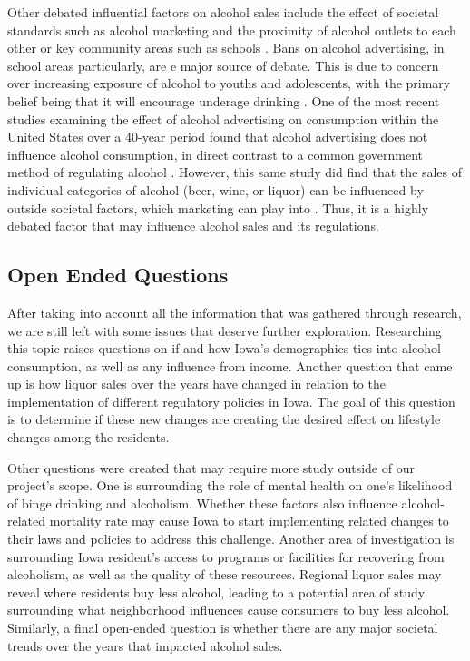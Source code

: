 \documentclass{article}
\begin{document}
Other debated influential factors on alcohol sales include the effect of societal standards such as alcohol marketing and the proximity of alcohol outlets to each other or key community areas such as schools \cite{campbell2009effectiveness, islam2022usefulness, wilcox2015beer}. Bans on alcohol advertising, in school areas particularly, are e major source of debate. This is due to concern over increasing exposure of alcohol to youths and adolescents, with the primary belief being that it will encourage underage drinking \cite{wilcox2015beer}. One of the most recent studies examining the effect of alcohol advertising on consumption within the United States over a 40-year period found that alcohol advertising does not influence alcohol consumption, in direct contrast to a common government method of regulating alcohol \cite{wilcox2015beer, babor2010alcohol}. However, this same study did find that the sales of individual categories of alcohol (beer, wine, or liquor) can be influenced by outside societal factors, which marketing can play into \cite{wilcox2015beer}. Thus, it is a highly debated factor that may influence alcohol sales and its regulations. 

\subsection{Open Ended Questions}
After taking into account all the information that was gathered through research, we are still left with some issues that deserve further exploration. Researching this topic raises questions on if and how Iowa’s demographics ties into alcohol consumption, as well as any influence from income. Another question that came up is how liquor sales over the years have changed in relation to the implementation of different regulatory policies in Iowa. The goal of this question is to determine if these new changes are creating the desired effect on lifestyle changes among the residents. 

Other questions were created that may require more study outside of our project's scope. One is surrounding the role of mental health on one's likelihood of binge drinking and alcoholism. Whether these factors also influence
alcohol-related mortality rate may cause Iowa to start implementing related changes to their laws and policies to address this challenge. 
Another area of investigation is surrounding Iowa resident's access to programs or facilities for recovering from alcoholism, as well as the quality of these resources. Regional liquor sales may reveal where residents buy less alcohol, leading to a potential area of study surrounding what neighborhood influences cause consumers to buy less alcohol. Similarly, a final open-ended question is whether there are any major societal trends over the years that impacted alcohol sales.
\end{document}
